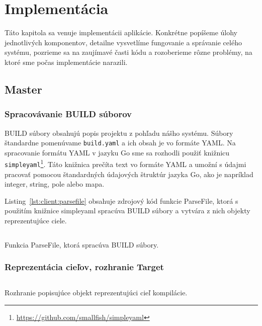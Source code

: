 \chapter{Implement\'{a}cia}
\label{ch:impl}

Táto kapitola sa venuje implementácii aplikácie. Konkrétne popíšeme úlohy
jednotlivých komponentov, detailne vysvetlíme fungovanie a správanie celého
systému, pozrieme sa na zaujímavé časti kódu a rozoberieme rôzne problémy,
na ktoré sme počas implementácie narazili.

\section{Master}
\label{sec:master}

\subsection{Spracov\'{a}vanie BUILD s\'{u}borov}
\label{sec:master:buildfile}

BUILD súbory obsahujú popis projektu z pohľadu nášho systému. Súbory štandardne
pomenúvame \texttt{build.yaml} a ich obsah je vo formáte YAML\@. Na spracovanie
formátu YAML v jazyku Go sme sa rozhodli použiť knižnicu
\texttt{simpleyaml}\footnote{\url{https://github.com/smallfish/simpleyaml}}.
Táto knižnica prečíta text vo formáte YAML a umožní s údajmi pracovať pomocou
štandardných údajových štruktúr jazyka Go, ako je napríklad integer, string,
pole alebo mapa.

Listing~\ref{lst:client:parsefile} obsahuje zdrojový kód funkcie ParseFile, ktorá
s použitím knižnice simpleyaml spracúva BUILD súbory a vytvára z nich objekty
reprezentujúce ciele.

\begin{listing}[H]
  \inputminted[frame=lines,framesep=2mm,linenos,fontsize=\scriptsize,firstline=44,lastline=75]{go}{/home/pepol/src/imterra/forge/client/target/parse.go}
  \caption[Funkcia ParseFile]{Funkcia ParseFile, ktorá spracúva BUILD súbory.}
  \label{lst:client:parsefile}
\end{listing}

\subsection{Reprezentácia cieľov, rozhranie Target}
\label{sec:master:target}

\begin{listing}[H]
  \inputminted[frame=lines,framesep=2mm,linenos,fontsize=\scriptsize,firstline=8,lastline=14]{go}{/home/pepol/src/imterra/forge/client/target/target.go}
  \caption[Rozhranie Target]{Rozhranie popisujúce objekt reprezentujúci cieľ kompilácie.}
  \label{lst:client:target}
\end{listing}

